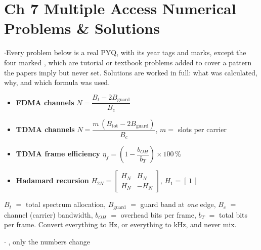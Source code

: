 \section*{\color{acc}Ch 7 \textperiodcentered{} Multiple Access \gap
\textcolor{sub}{Numerical Problems \& Solutions}}
\vspace{-4pt}{\color{acc}\rule{\textwidth}{1.1pt}}\vspace{4pt}

{\color{sub}\footnotesize {} \gap$\cdot$\gap Every problem below is a real PYQ, with its year tags and marks,
except the four marked , which are tutorial or textbook problems added to
cover a pattern the papers imply but never set. Solutions are worked in full: what was
calculated, why, and which formula was used. }

\begin{itemize}
  \item \textbf{FDMA channels} \; $N = \dfrac{B_t - 2 B_{\text{guard}}}{B_c}$
  \item \textbf{TDMA channels} \; $N = \dfrac{m\,(B_{\text{tot}} - 2 B_{\text{guard}})}{B_c}$,
        \; $m =$ slots per carrier
  \item \textbf{TDMA frame efficiency} \;
        $\eta_f = \left(1 - \dfrac{b_{OH}}{b_T}\right) \times 100\,\%$
  \item \textbf{Hadamard recursion} \;
        $H_{2N} = \begin{bmatrix} H_N & H_N \\ H_N & -H_N \end{bmatrix}$,
        \; $H_1 = [\,1\,]$
\end{itemize}
{\color{sub}\footnotesize $B_t$ $=$ total spectrum allocation, $B_{\text{guard}}$ $=$ guard band
at \emph{one} edge, $B_c$ $=$ channel (carrier) bandwidth, $b_{OH}$ $=$ overhead bits per frame,
$b_T$ $=$ total bits per frame.  Convert everything to Hz, or everything to kHz, and never mix.}

\hr

{\color{sub}\footnotesize {}  \gap$\cdot$\gap
{}, only the numbers change}

